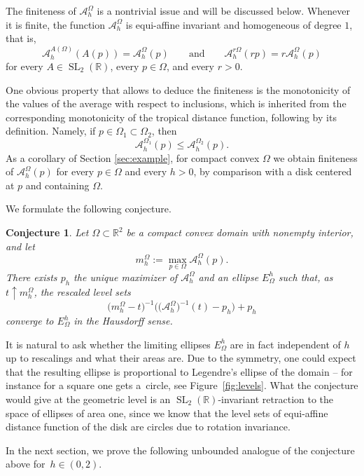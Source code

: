 \documentclass[10pt,a4paper]{amsart}
\numberwithin{equation}{section}
\newtheorem{Conjecture}[Theorem]{Conjecture}
\theoremstyle{definition}
\begin{document}
The finiteness of $\mathcal{A}_{h}^\Omega$ is a nontrivial issue and will be discussed below. Whenever it is finite, the function $\mathcal{A}_{h}^\Omega$ is equi-affine invariant and homogeneous of degree $1$, that is,
\[
\mathcal{A}_{h}^{A(\Omega)}(A(p))=\mathcal{A}_{h}^{\Omega}(p)
\qquad\text{and}\qquad
\mathcal{A}_{h}^{r\Omega}(rp)=r \mathcal{A}_{h}^{\Omega}(p)
\]
for every $A\in\operatorname{SL}_2(\mathbb{R})$, every $p\in\Omega$, and every $r>0$.

One obvious property that allows to deduce the finiteness is the monotonicity of the values of the average with respect to inclusions, which is inherited from the corresponding monotonicity of the tropical distance function, following by its definition. Namely, if $p\in\Omega_1\subset\Omega_2$, then \[\mathcal{A}_{h}^{\Omega_1}(p)\leq\mathcal{A}_{h}^{\Omega_2}(p).\] As a corollary of Section \ref{sec:example}, for compact convex
$\Omega$ we obtain finiteness of $\mathcal A_h^\Omega(p)$ for every
$p\in\Omega$ and every $h>0$, by comparison with a disk centered at $p$
and containing $\Omega$.

We formulate the following conjecture.

\begin{Conjecture}
Let $\Omega\subset\mathbb{R}^2$ be a compact convex domain with nonempty interior, and let
\[
m_h^\Omega:=\max_{p\in\Omega}\mathcal A_h^\Omega(p).
\]
There exists $p_h$ the unique maximizer of $\mathcal A_h^\Omega$ and an ellipse $E_\Omega^h$ such that, as $t\uparrow m_h^\Omega$, the rescaled level sets \[\bigl(m_h^\Omega-t\bigr)^{-1}\bigl(\bigl(\mathcal A_h^\Omega\bigr)^{-1}(t)-p_h\bigr)+p_h\]
converge to $E_\Omega^h$ in the Hausdorff sense.
\end{Conjecture}

It is natural to ask whether the limiting ellipses $E_\Omega^h$ are in fact independent of $h$ up to rescalings and what their areas are. Due to the symmetry, one could expect that the resulting ellipse is proportional to Legendre's ellipse of the domain -- for instance for a square one gets a~circle, see Figure~\ref{fig:levels}. What the conjecture would give at the geometric level is an $\operatorname{SL}_2(\mathbb{R})$-invariant retraction to the space of ellipses of area one, since we know that the level sets of equi-affine distance function of the disk are circles due to rotation invariance.

In the next section, we prove the following unbounded analogue of the conjecture above for~${h\in(0,2)}$.
\end{document}
